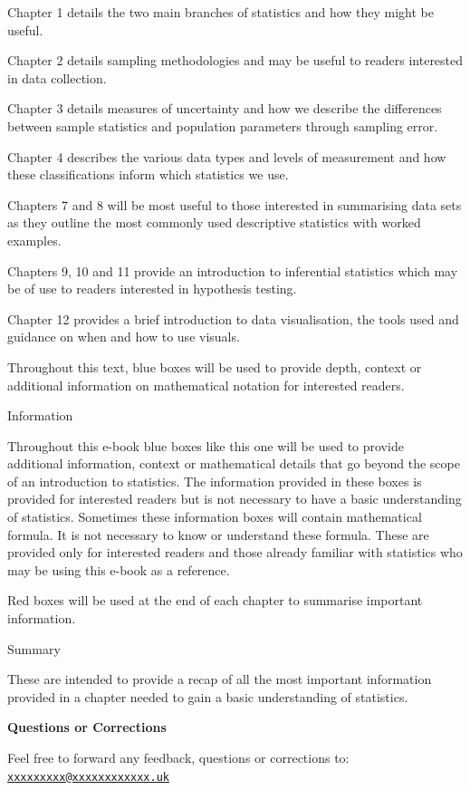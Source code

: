 \documentclass[
]{book}
\begin{document}
Chapter 1 details the two main branches of statistics and how they might be useful.

Chapter 2 details sampling methodologies and may be useful to readers interested in data collection.

Chapter 3 details measures of uncertainty and how we describe the differences between sample statistics and population parameters through sampling error.

Chapter 4 describes the various data types and levels of measurement and how these classifications inform which statistics we use.

Chapters 7 and 8 will be most useful to those interested in summarising data sets as they outline the most commonly used descriptive statistics with worked examples.

Chapters 9, 10 and 11 provide an introduction to inferential statistics which may be of use to readers interested in hypothesis testing.

Chapter 12 provides a brief introduction to data visualisation, the tools used and guidance on when and how to use visuals.

Throughout this text, blue boxes will be used to provide depth, context or additional information on mathematical notation for interested readers.

Information

Throughout this e-book blue boxes like this one will be used to provide additional information, context or mathematical details that go beyond the scope of an introduction to statistics. The information provided in these boxes is provided for interested readers but is not necessary to have a basic understanding of statistics. Sometimes these information boxes will contain mathematical formula. It is not necessary to know or understand these formula. These are provided only for interested readers and those already familiar with statistics who may be using this e-book as a reference.

Red boxes will be used at the end of each chapter to summarise important information.

Summary

These are intended to provide a recap of all the most important information provided in a chapter needed to gain a basic understanding of statistics.

\textbf{Questions or Corrections}

Feel free to forward any feedback, questions or corrections to: \href{mailto:xxxxxxxxx@xxxxxxxxxxxx.uk}{\nolinkurl{xxxxxxxxx@xxxxxxxxxxxx.uk}}
\end{document}
